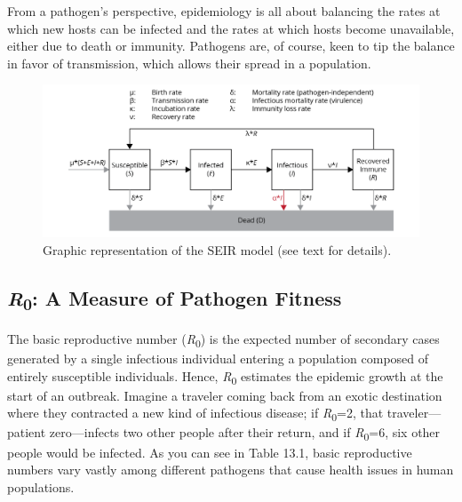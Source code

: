 \documentclass[
]{book}
\begin{document}
From a pathogen's perspective, epidemiology is all about balancing the rates at which new hosts can be infected and the rates at which hosts become unavailable, either due to death or immunity. Pathogens are, of course, keen to tip the balance in favor of transmission, which allows their spread in a population.

\begin{figure}
\includegraphics[width=1\linewidth]{images/seir} \caption{Graphic representation of the SEIR model (see text for details).}\label{fig:seir}
\end{figure}

\hypertarget{r0-a-measure-of-pathogen-fitness}{%
\subsection{\texorpdfstring{\emph{R}\textsubscript{0}: A Measure of Pathogen Fitness}{R0: A Measure of Pathogen Fitness}}\label{r0-a-measure-of-pathogen-fitness}}

The basic reproductive number (\emph{R}\textsubscript{0}) is the expected number of secondary cases generated by a single infectious individual entering a population composed of entirely susceptible individuals. Hence, \emph{R}\textsubscript{0} estimates the epidemic growth at the start of an outbreak. Imagine a traveler coming back from an exotic destination where they contracted a new kind of infectious disease; if \emph{R}\textsubscript{0}=2, that traveler---patient zero---infects two other people after their return, and if \emph{R}\textsubscript{0}=6, six other people would be infected. As you can see in Table 13.1, basic reproductive numbers vary vastly among different pathogens that cause health issues in human populations.
\end{document}
